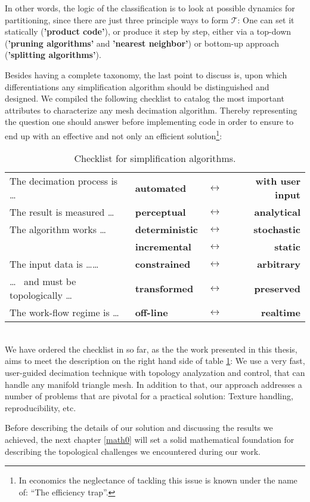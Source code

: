 In other words, the logic of the classification is to look at possible dynamics for partitioning, since there are just three principle ways to form $\mathcal{T}$: One can set it statically (\textbf{'product code'}), or produce it step by step, either via a top-down (\textbf{'pruning algorithms'} and \textbf{'nearest neighbor'}) or bottom-up approach (\textbf{'splitting algorithms'}).

Besides having a complete taxonomy, the last point to discuss is, upon which differentiations any simplification algorithm should be distinguished and designed.
We compiled the following checklist to catalog the most important attributes to characterize any mesh decimation algorithm.
Thereby representing the question one should answer before implementing code in order to ensure to end up with an effective and not only an efficient solution\footnote{ In economics the neglectance of tackling this issue is known under the name of: ``The efficiency trap''.}:
\begin{table}[htb]
\medskip
\setlength{\tabcolsep}{10pt}
\renewcommand{\arraystretch}{1.5}
   \centering
\begin{tabular}{ l l c r } \centering
	The decimation process is \dots & \textbf{automated} & $\longleftrightarrow$ & \textbf{with user input} \\
	The result is measured \dots & \textbf{perceptual} & $\longleftrightarrow$ & \textbf{analytical} \\
	The algorithm works \dots & \textbf{deterministic} & $\longleftrightarrow$ & \textbf{stochastic} \\
		 & \textbf{incremental} & $\longleftrightarrow$ & \textbf{static} \\
 	The input data is \dots \dots & \textbf{constrained} & $\longleftrightarrow$ & \textbf{arbitrary} \\
	\dots~ and must be topologically \dots & \textbf{transformed} & $\longleftrightarrow$ & \textbf{preserved} \\
	The work-flow regime is \dots & \textbf{off-line} & $\longleftrightarrow$ & \textbf{realtime} \\
\end{tabular}
   \label{tab:check_list} \bigskip
   \caption{Checklist for simplification algorithms.}
\end{table}\\
We have ordered the checklist in so far, as the the work presented in this thesis, aims to meet the description on the right hand side of table \ref{tab:check_list}: We use a very fast, user-guided decimation technique with topology analyzation and control, that can handle any manifold triangle mesh.
In addition to that, our approach addresses a number of problems that are pivotal for a practical solution: Texture handling, reproducibility, etc. 

Before describing the details of our solution and discussing the results we achieved, the next chapter \ref{math0} will set a solid mathematical foundation for describing the topological challenges we encountered during our work.
